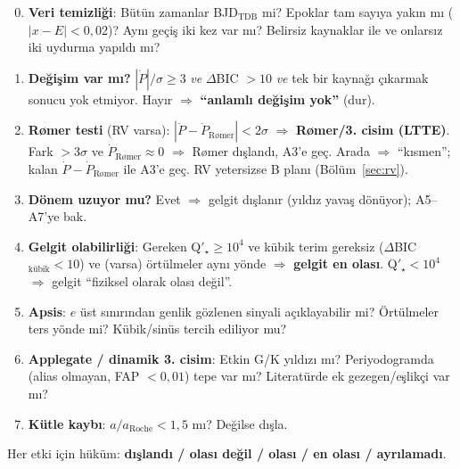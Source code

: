 \begin{enumerate}[label=\textbf{A\arabic*.},leftmargin=*]
\setcounter{enumi}{-1}
\item \textbf{Veri temizliği}: Bütün zamanlar BJD$_\mathrm{TDB}$ mi? Epoklar tam sayıya yakın mı ($|x-E|<0{,}02$)?
      Aynı geçiş iki kez var mı? Belirsiz kaynaklar ile ve onlarsız iki uydurma yapıldı mı?
\item \textbf{Değişim var mı?} $|\dot P|/\sigma \ge 3$ \emph{ve} $\Delta$BIC $>10$ \emph{ve}
      tek bir kaynağı çıkarmak sonucu yok etmiyor. Hayır $\Rightarrow$ \textbf{“anlamlı değişim yok”} (dur).
\item \textbf{Rømer testi} (RV varsa): $|\dot P - \dot P_\text{Rømer}| < 2\sigma$ $\Rightarrow$ \textbf{Rømer/3. cisim
      (LTTE)}. Fark $>3\sigma$ ve $\dot P_\text{Rømer}\approx0$ $\Rightarrow$ Rømer dışlandı, A3'e geç.
      Arada $\Rightarrow$ “kısmen”; kalan $\dot P - \dot P_\text{Rømer}$ ile A3'e geç. RV yetersizse B planı (Bölüm~\ref{sec:rv}).
\item \textbf{Dönem uzuyor mu?} Evet $\Rightarrow$ gelgit dışlanır (yıldız yavaş dönüyor); A5–A7'ye bak.
\item \textbf{Gelgit olabilirliği}: Gereken Q$'_\star \ge 10^4$ ve kübik terim gereksiz ($\Delta$BIC$_\text{kübik} < 10$)
      ve (varsa) örtülmeler aynı yönde $\Rightarrow$ \textbf{gelgit en olası}. Q$'_\star < 10^4$ $\Rightarrow$ gelgit
      “fiziksel olarak olası değil”.
\item \textbf{Apsis}: $e$ üst sınırından genlik gözlenen sinyali açıklayabilir mi? Örtülmeler ters yönde mi?
      Kübik/sinüs tercih ediliyor mu?
\item \textbf{Applegate / dinamik 3. cisim}: Etkin G/K yıldızı mı? Periyodogramda (alias olmayan, FAP $<0{,}01$) tepe
      var mı? Literatürde ek gezegen/eşlikçi var mı?
\item \textbf{Kütle kaybı}: $a/a_\text{Roche} < 1{,}5$ mı? Değilse dışla.
\end{enumerate}
Her etki için hüküm: \textbf{dışlandı / olası değil / olası / en olası / ayrılamadı}.

